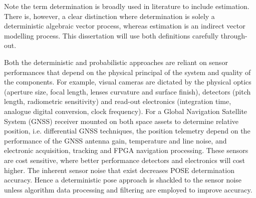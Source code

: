 Note the term determination is broadly used in literature to include estimation. There is, however, a clear distinction where determination is solely a deterministic algebraic vector process, whereas estimation is an indirect vector modelling process. This dissertation will use both definitions carefully through-out. 

Both the deterministic and probabilistic approaches are reliant on sensor performances that depend on the physical principal of the system and quality of the components. For example, visual cameras are dictated by the physical optics (aperture size, focal length, lenses curvature and surface finish), detectors (pitch length, radiometric sensitivity) and read-out electronics (integration time, analogue digital conversion, clock frequency). For a Global Navigation Satellite System (GNSS) receiver mounted on both space assets to determine relative position, i.e. differential GNSS techniques, the position telemetry depend on the performance of the GNSS antenna gain, temperature and line noise, and electronic  acquisition, tracking and FPGA navigation processing. These sensors are cost sensitive, where better performance detectors and electronics will cost higher. The inherent sensor noise that exist decreases POSE determination accuracy. Hence a deterministic pose approach is shackled to the sensor noise unless algorithm data processing and filtering are employed to improve accuracy.

